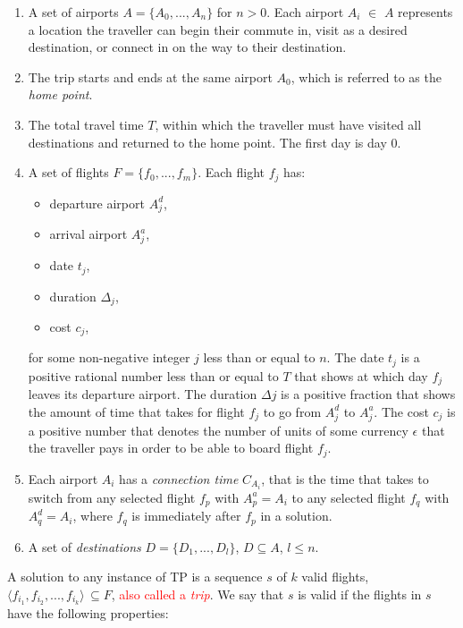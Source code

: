 \documentclass{mprop}
\theoremstyle{definition}
\begin{document}
\begin{enumerate}
\item A set of airports $A = \{ A_{0},...,A_{n} \}$ for $n > 0$. Each airport $A_{i}$ $\in$ $A$ represents a location the traveller can begin their commute in, visit as a desired destination, or connect in on the way to their destination.

\item The trip starts and ends at the same airport $A_{0}$, which is referred to as the \textit{home point}.

\item The total travel time $T$, within which the traveller must have visited all destinations and returned to the home point. The first day is day 0.
 
\item A set of flights $F = \{ f_{0},...,f_{m} \}$. Each flight $f_{j}$ has:
\begin{itemize}
\item departure airport $A^{d}_{j}$,
\item arrival airport $A^{a}_{j}$,
\item date $t_{j}$,
\item duration $\Delta_{j}$,
\item cost $c_{j}$,
\end{itemize} 
for some non-negative integer $j$ less than or equal to $n$.
The date $t_{j}$ is a positive rational number less than or equal to $T$ that shows at which day $f_{j}$ leaves its departure airport. The duration $\Delta{j}$ is a positive fraction that shows the amount of time that takes for flight $f_{j}$ to go from $A^{d}_{j}$ to $A^{a}_{j}$. The cost $c_{j}$ is a positive number that denotes the number of units of some currency $\epsilon$ that the traveller pays in order to be able to board flight $f_{j}$.

\item Each airport $A_{i}$ has a \textit{connection time} $C_{A_{i}}$, that is the time that takes to switch from any selected flight $f_{p}$ with $A^{a}_{p} = A_{i}$ to any selected flight $f_{q}$ with $A^{d}_{q} = A_{i}$, where $f_{q}$ is immediately after $f_{p}$ in a solution.

\item A set of \textit{destinations} $D = \{ D_{1},...,D_{l} \}$, $D \subseteq A$, $l \leq n$.
\end{enumerate}

A solution to any instance of TP is a sequence $s$ of $k$ valid flights, $ \langle f_{i_{1}}, f_{i_{2}},...,f_{i_{k}} \rangle \, \subseteq F$, \textcolor{red}{also called a \textit{trip}}. We say that $s$ is valid if the flights in $s$ have the following properties:
\end{document}
